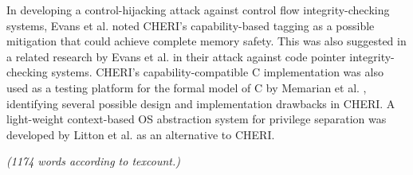\documentclass[11pt]{article}
\begin{document}
In developing a control-hijacking attack against control flow integrity-checking systems, Evans et al. \cite{backes2015boxify} noted CHERI's capability-based tagging as a possible mitigation that could achieve complete memory safety. This was also suggested in a related research by Evans et al. \cite{evans2015missing} in their attack against code pointer integrity-checking systems. CHERI's capability-compatible C implementation was also used as a testing platform for the formal model of C by Memarian et al. \cite{memarian2016into}, identifying several possible design and implementation drawbacks in CHERI. A light-weight context-based OS abstraction system for privilege separation was developed by Litton et al. \cite{litton2016light} as an alternative to CHERI.

\emph{(1174 words according to texcount.)}


\footnotesize{}
\end{document}

